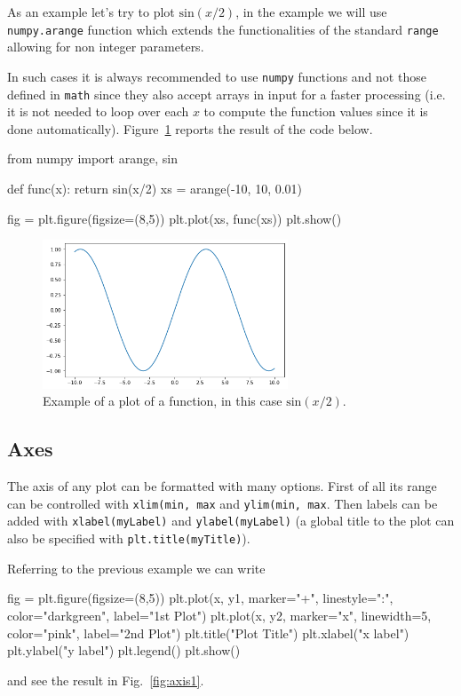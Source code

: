 As an example let's try to plot $\mathrm{sin}(x/2)$, in the example we will use \texttt{numpy.arange} function which extends the functionalities of the standard \texttt{range} allowing for non integer parameters.

In such cases it is always recommended to use \texttt{numpy} functions and not those defined in \texttt{math} since they also accept arrays in input for a faster processing (i.e. it is not needed to loop over each $x$ to compute the function values since it is done automatically).
Figure~\ref{fig:sinx_x} reports the result of the code below.

\begin{ipython}
from numpy import arange, sin

def func(x):
    return sin(x/2)
xs = arange(-10, 10, 0.01)

fig = plt.figure(figsize=(8,5))
plt.plot(xs, func(xs))
plt.show()
\end{ipython}

\begin{figure}[htb]
	\centering
	\includegraphics[width=0.65\textwidth]{figures/sinx_x}
	\caption{Example of a plot of a function, in this case \(\mathrm{sin}(x/2)\).}
	\label{fig:sinx_x}
\end{figure}

\subsection{Axes}\label{axes}

The axis of any plot can be formatted with many options.
First of all its range can be controlled with \texttt{xlim(min, max} and \texttt{ylim(min, max}. Then labels can be added with \texttt{xlabel(myLabel)} and \texttt{ylabel(myLabel)} (a global title to the plot can also be specified with \texttt{plt.title(myTitle)}).

Referring to the previous example we can write

\begin{ipython}
fig = plt.figure(figsize=(8,5))
plt.plot(x, y1, marker="+", linestyle=":", color="darkgreen", label="1st Plot")
plt.plot(x, y2, marker="x", linewidth=5, color="pink", label="2nd Plot")
plt.title("Plot Title")
plt.xlabel("x label")
plt.ylabel("y label")
plt.legend()
plt.show()
\end{ipython}
\noindent
and see the result in Fig.~\ref{fig:axis1}.

